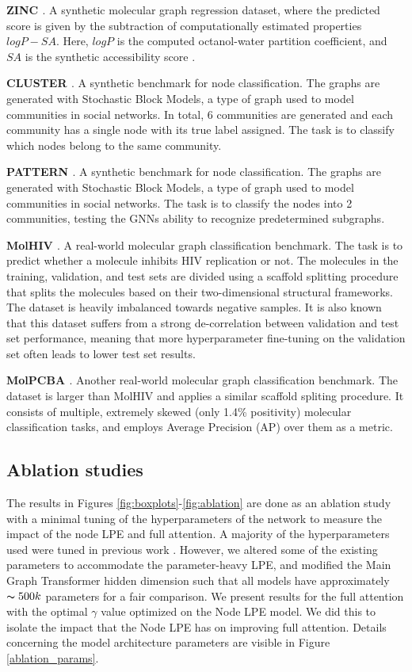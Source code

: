 \documentclass{article}
\newcommand{\xhdr}[1]{{\noindent\bfseries #1}.}
\begin{document}
\xhdr{ZINC \cite{dwivedi2020benchmarking}} 
A synthetic molecular graph regression dataset, where the predicted score is given by the subtraction of computationally estimated properties $logP-SA$. Here, $logP$ is the computed octanol-water partition coefficient, and $SA$ is the synthetic accessibility score \cite{jin_junction_2018}.
    
\xhdr{CLUSTER \cite{dwivedi2020benchmarking}}
A synthetic benchmark for node classification. The graphs are generated with Stochastic Block Models, a type of graph used to model communities in social networks. In total, 6 communities are generated and each community has a single node with its true label assigned. The task is to classify which nodes belong to the same community.

\xhdr{PATTERN \cite{dwivedi2020benchmarking}} 
A synthetic benchmark for node classification. The graphs are generated with Stochastic Block Models, a type of graph used to model communities in social networks. The task is to classify the nodes into 2 communities, testing the GNNs ability to recognize predetermined subgraphs.
    
\xhdr{MolHIV \cite{hu2020open}} 
A real-world molecular graph classification benchmark. The task is to predict whether a molecule inhibits HIV replication or not. The molecules in the training, validation, and test sets are divided using a scaffold splitting procedure that splits the molecules based on their two-dimensional structural frameworks. The dataset is heavily imbalanced towards negative samples. It is also known that this dataset suffers from a strong de-correlation between validation and test set performance, meaning that more hyperparameter fine-tuning on the validation set often leads to lower test set results.

\xhdr{MolPCBA \cite{hu2020open}} 
Another real-world molecular graph classification benchmark. The dataset is larger than MolHIV and applies a similar scaffold spliting procedure. It consists of multiple, extremely skewed (only 1.4\% positivity) molecular classification tasks, and employs Average Precision (AP) over them as a metric.
    
\subsection{Ablation studies}
\label{app:ablation}

The results in Figures \ref{fig:boxplots}-\ref{fig:ablation} are done as an ablation study with a minimal tuning of the hyperparameters of the network to measure the impact of the node LPE and full attention. A majority of the hyperparameters used were tuned in previous work \cite{dwivedi2020benchmarking}. However, we altered some of the existing parameters to accommodate the parameter-heavy LPE, and modified the Main Graph Transformer hidden dimension such that all models have approximately $\thicksim 500k$ parameters for a fair comparison. We present results for the full attention with the optimal $\gamma$ value optimized on the Node LPE model. We did this to isolate the impact that the Node LPE has on improving full attention. Details concerning the model architecture parameters are visible in Figure \ref{ablation_params}.
\end{document}
